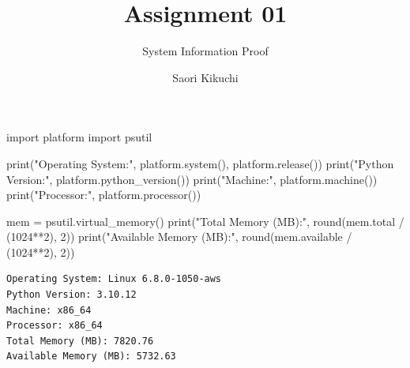 \documentclass[
  letterpaper,
  DIV=11,
  numbers=noendperiod]{scrartcl}
\title{Assignment 01}
\subtitle{System Information Proof}
\author{Saori Kikuchi}
\date{}
\newenvironment{Shaded}{\begin{snugshade}}{\end{snugshade}}
\newcommand{\BuiltInTok}[1]{\textcolor[rgb]{0.00,0.23,0.31}{#1}}
\newcommand{\DecValTok}[1]{\textcolor[rgb]{0.68,0.00,0.00}{#1}}
\newcommand{\ImportTok}[1]{\textcolor[rgb]{0.00,0.46,0.62}{#1}}
\newcommand{\NormalTok}[1]{\textcolor[rgb]{0.00,0.23,0.31}{#1}}
\newcommand{\OperatorTok}[1]{\textcolor[rgb]{0.37,0.37,0.37}{#1}}
\newcommand{\StringTok}[1]{\textcolor[rgb]{0.13,0.47,0.30}{#1}}
\begin{document}
\maketitle

\begin{Shaded}
\begin{Highlighting}[]
\ImportTok{import}\NormalTok{ platform}
\ImportTok{import}\NormalTok{ psutil}

\BuiltInTok{print}\NormalTok{(}\StringTok{"Operating System:"}\NormalTok{, platform.system(), platform.release())}
\BuiltInTok{print}\NormalTok{(}\StringTok{"Python Version:"}\NormalTok{, platform.python\_version())}
\BuiltInTok{print}\NormalTok{(}\StringTok{"Machine:"}\NormalTok{, platform.machine())}
\BuiltInTok{print}\NormalTok{(}\StringTok{"Processor:"}\NormalTok{, platform.processor())}

\NormalTok{mem }\OperatorTok{=}\NormalTok{ psutil.virtual\_memory()}
\BuiltInTok{print}\NormalTok{(}\StringTok{"Total Memory (MB):"}\NormalTok{, }\BuiltInTok{round}\NormalTok{(mem.total }\OperatorTok{/}\NormalTok{ (}\DecValTok{1024}\OperatorTok{**}\DecValTok{2}\NormalTok{), }\DecValTok{2}\NormalTok{))}
\BuiltInTok{print}\NormalTok{(}\StringTok{"Available Memory (MB):"}\NormalTok{, }\BuiltInTok{round}\NormalTok{(mem.available }\OperatorTok{/}\NormalTok{ (}\DecValTok{1024}\OperatorTok{**}\DecValTok{2}\NormalTok{), }\DecValTok{2}\NormalTok{))}
\end{Highlighting}
\end{Shaded}

\begin{verbatim}
Operating System: Linux 6.8.0-1050-aws
Python Version: 3.10.12
Machine: x86_64
Processor: x86_64
Total Memory (MB): 7820.76
Available Memory (MB): 5732.63
\end{verbatim}
\end{document}
